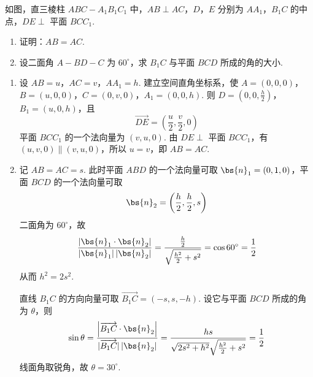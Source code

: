 \begin{problem}
如图，直三棱柱 \(ABC - A_{1}B_{1}C_{1}\) 中，\(AB \perp AC\)，\(D\)，\(E\) 分别为 \(AA_{1}\)，\(B_{1}C\) 的中点，\(DE \perp\) 平面 \(BCC_{1}\).

\begin{enumerate}
\item 证明：\(AB = AC\).
\item 设二面角 \(A - BD - C\) 为 \(60^{\circ}\)，求 \(B_{1}C\) 与平面 \(BCD\) 所成的角的大小.
\end{enumerate}


\begin{solution}
\begin{enumerate}
\item 设 \(AB=u\)，\(AC=v\)，\(AA_{1}=h\). 建立空间直角坐标系，使
\(A=(0,0,0)\)，\(B=(u,0,0)\)，\(C=(0,v,0)\)，\(A_{1}=(0,0,h)\).
则 \(D=(0,0,\frac h2)\)，\(B_{1}=(u,0,h)\)，且
\[
\overrightarrow{DE}=\left(\frac u2,\frac v2,0\right)
\]
平面 \(BCC_{1}\) 的一个法向量为 \((v,u,0)\). 由 \(DE\perp\) 平面 \(BCC_{1}\)，有 \((u,v,0)\parallel(v,u,0)\)，所以 \(u=v\)，即 \(AB=AC\).
\item 记 \(AB=AC=s\). 此时平面 \(ABD\) 的一个法向量可取 \(\bs{n}_{1}=(0,1,0)\)，平面 \(BCD\) 的一个法向量可取
\[
\bs{n}_{2}=\left(\frac h2,\frac h2,s\right)
\]
二面角为 \(60^{\circ}\)，故
\[
\frac{\left|\bs{n}_{1}\cdot\bs{n}_{2}\right|}{|\bs{n}_{1}|\,|\bs{n}_{2}|}
=\frac{\frac{h}{2}}{\sqrt{\frac{h^{2}}{2}+s^{2}}}=\cos60^{\circ}=\frac12
\]
从而 \(h^{2}=2s^{2}\).

直线 \(B_{1}C\) 的方向向量可取 \(\overrightarrow{B_{1}C}=(-s,s,-h)\). 设它与平面 \(BCD\) 所成的角为 \(\theta\)，则
\[
\sin\theta=\frac{\left|\overrightarrow{B_{1}C}\cdot\bs{n}_{2}\right|}{|\overrightarrow{B_{1}C}|\,|\bs{n}_{2}|}
=\frac{hs}{\sqrt{2s^{2}+h^{2}}\sqrt{\frac{h^{2}}{2}+s^{2}}}
=\frac12
\]
线面角取锐角，故 \(\theta=30^{\circ}\).
\end{enumerate}
\end{solution}
\end{problem}

